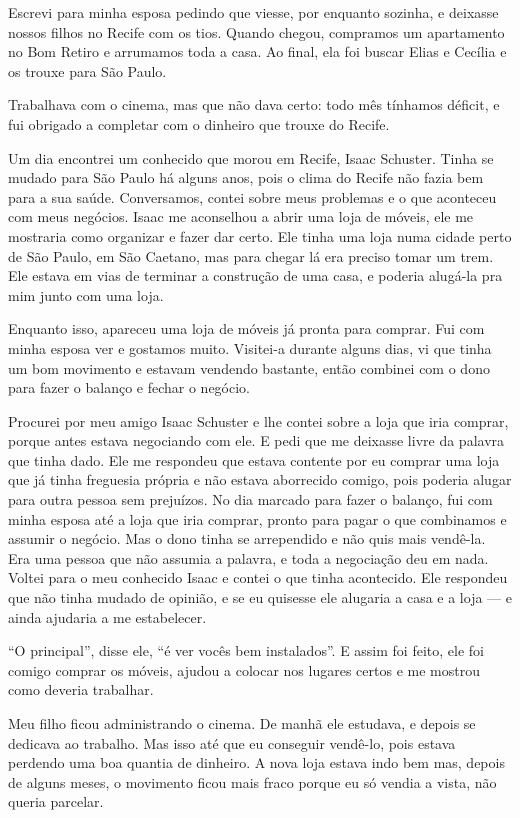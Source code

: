 Escrevi para minha esposa pedindo que viesse, por enquanto sozinha, e
deixasse nossos filhos no Recife com os tios. Quando chegou, compramos 
um apartamento no Bom Retiro e arrumamos toda a casa. Ao final, ela foi 
buscar Elias e Cecília e os trouxe para São Paulo.

Trabalhava com o cinema, mas que não dava certo: todo mês tínhamos  
déficit, e fui obrigado a completar com o dinheiro que trouxe do Recife.

Um dia encontrei um conhecido que morou em Recife, Isaac Schuster. 
Tinha se mudado para São Paulo há alguns anos, pois o clima do 
Recife não fazia bem para a sua saúde.
Conversamos, contei sobre meus problemas e o que aconteceu com meus negócios. Isaac me aconselhou a abrir uma loja
de móveis, ele me mostraria como organizar e fazer dar
certo. Ele tinha uma loja numa cidade perto de São Paulo, em São
Caetano, mas para chegar lá era preciso tomar um trem. Ele estava em vias de terminar a construção de uma casa, e poderia alugá-la pra mim junto com uma loja.

Enquanto isso, apareceu uma loja de móveis já pronta para comprar. 
Fui com minha esposa ver e gostamos muito. Visitei-a durante alguns
dias, vi que tinha um bom movimento e estavam vendendo bastante, então
combinei com o dono para fazer o balanço e fechar o negócio.

Procurei por meu amigo Isaac Schuster e lhe contei sobre a loja que
iria comprar, porque antes estava negociando com ele. E pedi que
me deixasse livre da palavra que tinha dado. Ele me respondeu que
estava contente por eu comprar uma loja que já tinha freguesia própria e não estava aborrecido comigo, pois poderia alugar para
outra pessoa sem prejuízos. No dia marcado para fazer o
balanço, fui com minha esposa até a loja que iria comprar, pronto
para pagar o que combinamos e assumir o negócio. Mas o dono
tinha se arrependido e não quis mais vendê-la. Era uma pessoa que
não assumia a palavra, e toda a negociação deu em nada. Voltei para o
meu conhecido Isaac e contei o que tinha acontecido. Ele respondeu que não tinha mudado de opinião, e se
eu quisesse ele alugaria a casa e a loja --- e ainda ajudaria a me
estabelecer.

``O principal'', disse ele, ``é ver vocês bem instalados''. E assim foi
feito, ele foi comigo comprar os móveis, ajudou a colocar nos lugares
certos e me mostrou como deveria trabalhar.

Meu filho ficou administrando o cinema. De manhã ele estudava, e depois
se dedicava ao trabalho. Mas isso até que eu conseguir
vendê-lo, pois estava perdendo uma boa quantia de dinheiro. A nova loja estava indo
bem mas, depois de alguns meses, o movimento ficou mais fraco porque eu
só vendia a vista, não queria parcelar. 

